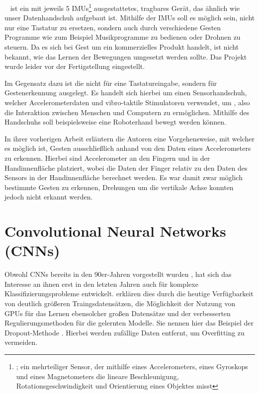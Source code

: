 ~\cite{web:gest} ist ein mit jeweils 5 IMUs\footnote{; ein mehrteiliger Sensor, der mithilfe eines Accelerometers, eines Gyroskops und eines Magnetometers die lineare Beschleunigung, Rotationsgeschwindigkeit und Orientierung eines Objektes misst} ausgestattetes, tragbares Gerät, das ähnlich wie unser Datenhandschuh aufgebaut ist.
Mithilfe der IMUs soll es möglich sein, nicht nur eine Tastatur zu ersetzen, sondern auch durch verschiedene Gesten Programme wie zum Beispiel Musikprogramme zu bedienen oder  Drohnen zu steuern. Da es sich bei Gest um ein kommerzielles Produkt handelt, ist nicht bekannt, wie das Lernen der Bewegungen umgesetzt werden sollte. Das Projekt wurde leider vor der Fertigstellung eingestellt.

Im Gegensatz dazu ist die  \citep{inertouchhand} nicht für eine Tastatureingabe, sondern für Gestenerkennung ausgelegt. Es handelt sich hierbei um einen Sensorhandschuh, welcher Accelerometerdaten und vibro-taktile Stimulatoren verwendet, um , also die Interaktion zwischen Menschen und Computern zu ermöglichen. Mithilfe des Handschuhs soll beispielsweise eine Roboterhand bewegt werden können.

In ihrer vorherigen Arbeit \citep{pre_inertouchhand} erläutern die Autoren eine Vorgehensweise, mit welcher es möglich ist, Gesten ausschließlich anhand von den Daten eines Accelerometers zu erkennen.
Hierbei sind Accelerometer an den Fingern und in der Handinnenfläche platziert, wobei die Daten der Finger relativ zu den Daten des Sensors in der Handinnenfläche berechnet werden. Es war damit zwar möglich bestimmte Gesten zu erkennen, Drehungen um die vertikale Achse konnten jedoch nicht erkannt werden.

\section{Convolutional Neural Networks (CNNs)} %

Obwohl CNNs bereits in den 90er-Jahren vorgestellt wurden \citep{handwritten_cnn}, hat sich das Interesse an ihnen erst in den letzten Jahren auch für komplexe Klassifizierungsprobleme entwickelt. \citet{visual_cnn} erklären dies durch die heutige Verfügbarkeit von deutlich größeren Traingsdatensätzen, die Möglichkeit der Nutzung von GPUs für das Lernen ebensolcher großen Datensätze und der verbesserten Regulierungsmethoden für die gelernten Modelle. Sie nennen hier das Beispiel der Dropout-Methode \citep{dropout}. Hierbei werden zufällige Daten entfernt, um Overfitting zu vermeiden.

